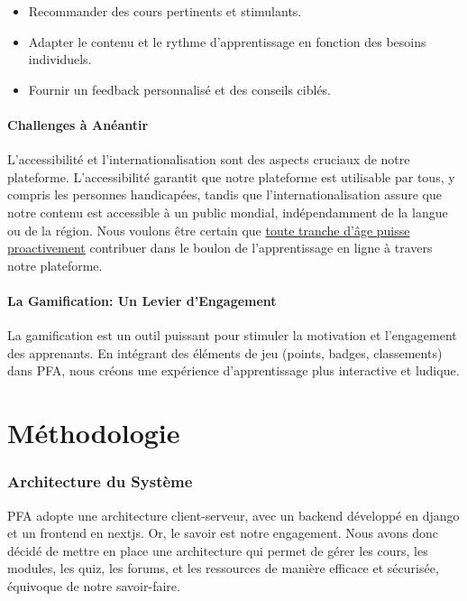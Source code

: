 \begin{itemize}
    \item Recommander des cours pertinents et stimulants. 
    \item Adapter le contenu et le rythme d'apprentissage en fonction des besoins individuels. 
    \item Fournir un feedback personnalisé et des conseils ciblés.
\end{itemize}

\subsection{ Challenges à Anéantir}

L'accessibilité et l'internationalisation sont des aspects cruciaux de notre plateforme. L'accessibilité garantit que notre plateforme est utilisable par tous, y compris les personnes handicapées, tandis que l'internationalisation assure que notre contenu est accessible à un public mondial, indépendamment de la langue ou de la région.
\smallbreak Nous voulons être certain que  \underline {toute tranche d'âge puisse proactivement} contribuer dans le boulon de l'apprentissage en ligne à travers notre plateforme.

\subsection{La Gamification: Un Levier d'Engagement}

La \gls{gamification} est un outil puissant pour stimuler la motivation et l'engagement des apprenants. En intégrant des éléments de jeu (points, badges, classements) dans PFA, nous créons une expérience d'apprentissage plus interactive et ludique.
\newpage

\part{Méthodologie}

\section{Architecture du Système}

PFA adopte une architecture client-serveur, avec un backend développé en \gls{django} et un frontend en \gls{nextjs}.
Or, le savoir est notre engagement. Nous avons donc décidé de mettre en place une architecture qui permet de gérer les cours, les modules, les quiz, les forums, et les ressources de manière efficace et sécurisée, équivoque de notre savoir-faire.

